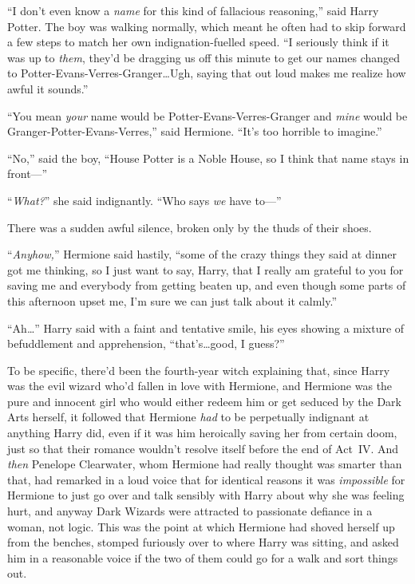 “I don’t even know a \emph{name} for this kind of fallacious reasoning,” said Harry Potter. The boy was walking normally, which meant he often had to skip forward a few steps to match her own indignation-fuelled speed.
“I seriously think if it was up to \emph{them}, they’d be dragging us off this minute to get our names changed to Potter-Evans-Verres-Granger…Ugh, saying that out loud makes me realize how awful it sounds.”

“You mean \emph{your} name would be Potter-Evans-Verres-Granger and \emph{mine} would be Granger-Potter-Evans-Verres,” said Hermione.
“It’s too horrible to imagine.”

“No,” said the boy,
“House Potter is a Noble House, so I think that name stays in front—”

“\emph{What?}” she said indignantly.
“Who says \emph{we} have to—”

There was a sudden awful silence, broken only by the thuds of their shoes.

“\emph{Anyhow,}” Hermione said hastily, “some of the crazy things they said at dinner got me thinking, so I just want to say, Harry, that I really am grateful to you for saving me and everybody from getting beaten up, and even though some parts of this afternoon upset me, I’m sure we can just talk about it calmly.”

“Ah…” Harry said with a faint and tentative smile, his eyes showing a mixture of befuddlement and apprehension, “that’s…good, I guess?”

To be specific, there’d been the fourth-year witch explaining that, since Harry was the evil wizard who’d fallen in love with Hermione, and Hermione was the pure and innocent girl who would either redeem him or get seduced by the Dark Arts herself, it followed that Hermione \emph{had} to be perpetually indignant at anything Harry did, even if it was him heroically saving her from certain doom, just so that their romance wouldn’t resolve itself before the end of Act~IV. And \emph{then} Penelope Clearwater, whom Hermione had really thought was smarter than that, had remarked in a loud voice that for identical reasons it was \emph{impossible} for Hermione to just go over and talk sensibly with Harry about why she was feeling hurt, and anyway Dark Wizards were attracted to passionate defiance in a woman, not logic. This was the point at which Hermione had shoved herself up from the benches, stomped furiously over to where Harry was sitting, and asked him in a reasonable voice if the two of them could go for a walk and sort things out.

